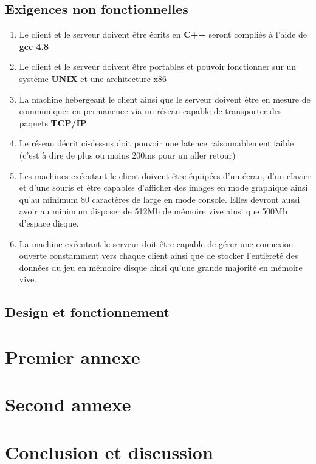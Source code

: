 \documentclass[a4paper]{article}
\begin{document}
\subsection{Exigences non fonctionnelles}
\label{enf}
\begin{enumerate}
\item Le client et le serveur doivent être écrits en \textbf{C++} seront compliés à l'aide de \textbf{gcc 4.8}
\item Le client et le serveur doivent être portables et pouvoir fonctionner sur un système \textbf{UNIX} et une architecture x86
\item La machine hébergeant le client ainsi que le serveur doivent être en mesure de communiquer en permanence via un réseau capable de transporter des paquets \textbf{TCP/IP}
\item Le réseau décrit ci-dessus doit pouvoir une latence raisonnablement faible (c'est à dire de plus ou moins 200ms pour un aller retour)
\item Les machines exécutant le client doivent être équipées d'un écran, d'un clavier et d'une souris et être capables d'afficher des images en mode graphique ainsi qu'au minimum 80 caractères de large en mode console. Elles devront aussi avoir au minimum disposer de 512Mb de mémoire vive ainsi que 500Mb d'espace disque.
\item La machine exécutant le serveur doit être capable de gérer une connexion ouverte constamment vers chaque client ainsi que de stocker l'entièreté des données du jeu en mémoire disque ainsi qu'une grande majorité en mémoire vive.
\end{enumerate}

\subsection{Design et fonctionnement}

\printindex

\appendix

\section{Premier annexe}
\section{Second annexe}

\section{Conclusion et discussion}

\tableofcontents    %
\listoffigures        %
\listoftables        %

\end{document}
